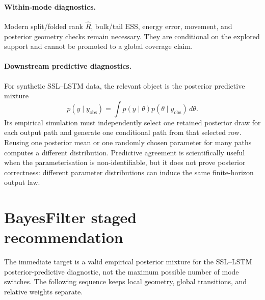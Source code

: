 \documentclass[11pt]{article}
\begin{document}
\paragraph{Within-mode diagnostics.}
Modern split/folded rank $\widehat R$, bulk/tail ESS, energy error, movement, and
posterior geometry checks remain necessary.  They are conditional on the explored
support and cannot be promoted to a global coverage claim.

\paragraph{Downstream predictive diagnostics.}
For synthetic SSL--LSTM data, the relevant object is the posterior predictive
mixture
\begin{equation}
 p(y\mid y_{\mathrm{obs}})
 =\int p(y\mid\theta)p(\theta\mid y_{\mathrm{obs}})\,d\theta.
 \label{eq:posterior-predictive}
\end{equation}
Its empirical simulation must independently select one retained posterior draw for
each output path and generate one conditional path from that selected row.  Reusing
one posterior mean or one randomly chosen parameter for many paths computes a
different distribution.  Predictive agreement is scientifically useful when the
parameterisation is non-identifiable, but it does not prove posterior correctness:
different parameter distributions can induce the same finite-horizon output law.

\section{BayesFilter staged recommendation}

The immediate target is a valid empirical posterior mixture for the SSL--LSTM
posterior-predictive diagnostic, not the maximum possible number of mode switches.
The following sequence keeps local geometry, global transitions, and relative weights
separate.
\end{document}
